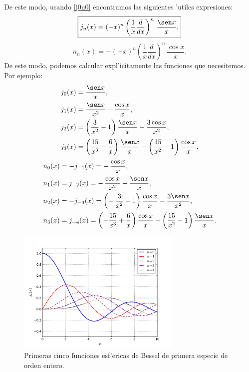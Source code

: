 De este modo, usando \eqref{j0n0} encontramos las siguientes 'utiles expresiones:
\begin{equation}
\boxed{j_n(x) = (-x)^n \left(\frac{1}{x}\frac{d}{dx}\right)^n\,\frac{\sen x}{x},}
\end{equation}
\begin{equation}
\boxed{n_n(x) = -(-x)^n \left(\frac{1}{x}\frac{d}{dx}\right)^n\,\frac{\cos x}{x}.}
\end{equation}
De este modo, podemos calcular expl'icitamente las funciones que necesitemos. Por ejemplo:
\begin{align}
j_0(x) &= \frac{\sen x}{x}, \\
j_1(x) &= \frac{\sen x} {x^2}- \frac{\cos x} {x}, \\
j_2(x) &= \left(\frac{3} {x^2} - 1 \right)\frac{\sen x}{x} - \frac{3\cos x} {x^2}, \\
j_3(x) &= \left(\frac{15}{x^3} - \frac{6}{x} \right)\frac{\sen x}{x} -\left(\frac{15}{x^2} - 1\right) \frac{\cos x} {x},
\end{align}
\begin{align}
n_0(x) &= -j_{-1}(x)=-\,\frac{\cos x} {x} ,\\
n_1(x) &= j_{-2}(x)=-\,\frac{\cos x} {x^2}- \frac{\sen x} {x}, \\
n_2(x) &=-j_{-3}(x)=\left(-\,\frac{3}{x^2}+1 \right)\frac{\cos x}{x}- \frac{3 \sen x} {x^2}, \\
n_{3}(x) &= j_{-4}(x) =\left( -\frac{15}{x^{3}}+\frac{6}{x}\right) \frac{\cos
x}{x}-\left( \frac{15}{x^{2}}-1\right) \frac{\sen x}{x}.
\end{align}
\begin{figure}[H]
\centering
\includegraphics[angle=0,width=0.7\textwidth]{figs/fig-Bessel-Esferica-j.pdf}
\caption{Primeras cinco funciones esf'ericas de Bessel de primera especie de orden entero.}
\label{fig-jn}
\end{figure}
